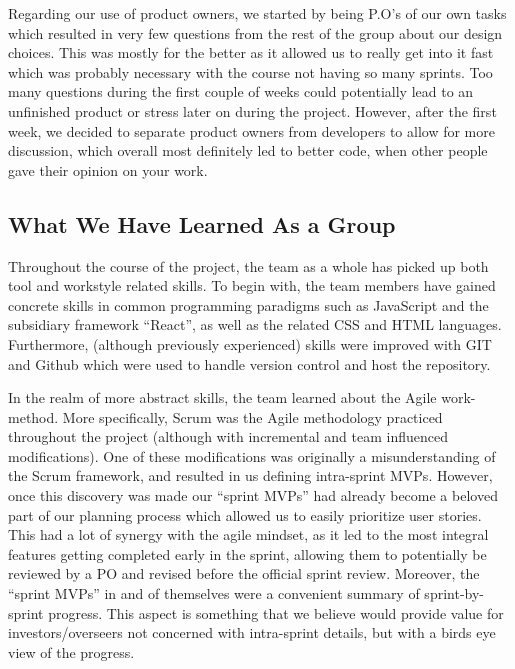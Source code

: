 Regarding our use of product owners, we started by being P.O’s of our own tasks which resulted in very few questions from the rest of the group about our design choices. This was mostly for the better as it allowed us to really get into it fast which was probably necessary with the course not having so many sprints. Too many questions during the first couple of weeks could potentially lead to an unfinished product or stress later on during the project. However, after the first week, we decided to separate product owners from developers to allow for more discussion, which overall most definitely led to better code, when other people gave their opinion on your work.


\subsection{What We Have Learned As a Group}
Throughout the course of the project, the team as a whole has picked up both tool and workstyle related skills. To begin with, the team members have gained concrete skills in common programming paradigms such as JavaScript\cite{JavaScript} and the subsidiary framework “React”\cite{React}, as well as the related CSS\cite{CSS} and HTML\cite{HTML} languages. Furthermore, (although previously experienced) skills were improved with GIT and Github which were used to handle version control and host the repository. 

In the realm of more abstract skills, the team learned about the Agile work-method. More specifically, Scrum was the Agile methodology practiced throughout the project (although with incremental and team influenced modifications). One of these modifications was originally a misunderstanding of the Scrum framework, and resulted in us defining intra-sprint MVPs. However, once this discovery was made our “sprint MVPs” had already become a beloved part of our planning process which allowed us to easily prioritize user stories. This had a lot of synergy with the agile mindset, as it led to the most integral features getting completed early in the sprint, allowing them to potentially be reviewed by a PO and revised before the official sprint review. Moreover, the “sprint MVPs” in and of themselves were a convenient summary of sprint-by-sprint progress. This aspect is something that we believe would provide value for investors/overseers not concerned with intra-sprint details, but with a birds eye view of the progress. 

